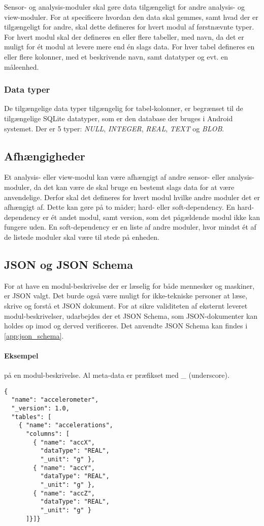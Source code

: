 Sensor- og analysis-moduler skal gøre data tilgængeligt for andre analysis- og view-moduler.
For at specificere hvordan den data skal gemmes, samt hvad der er tilgængeligt for andre, skal dette defineres for hvert modul af førstnævnte typer.
For hvert modul skal der defineres en eller flere tabeller, med navn, da det er muligt for ét modul at levere mere end én slags data.
For hver tabel defineres en eller flere kolonner, med et beskrivende navn, samt datatyper og evt. en måleenhed.

\subsubsection{Data typer}
De tilgængelige data typer tilgængelig for tabel-kolonner, er begrænset til de tilgængelige SQLite datatyper, som er den database der bruges i Android systemet.
Der er 5 typer: \textit{NULL}, \textit{INTEGER}, \textit{REAL}, \textit{TEXT} og \textit{BLOB}.

\subsection{Afhængigheder}
Et analysis- eller view-modul kan være afhængigt af andre sensor- eller analysis-moduler, da det kan være de skal bruge en bestemt slags data for at være anvendelige.
Derfor skal det defineres for hvert modul hvilke andre moduler det er afhængigt af.
Dette kan gøre på to måder; hard- eller soft-dependency.
En hard-dependency er ét andet modul, samt version, som det pågældende modul ikke kan fungere uden.
En soft-dependency er en liste af andre moduler, hvor mindst ét af de listede moduler skal være til stede på enheden.

\subsection{JSON og JSON Schema}
For at have en modul-beskrivelse der er læselig for både mennesker og maskiner, er JSON valgt.
Det burde også være muligt for ikke-tekniske personer at læse, skrive og forstå et JSON dokument.
For at sikre validiteten af eksternt leveret modul-beskrivelser, udarbejdes der et JSON Schema, som JSON-dokumenter kan holdes op imod og derved verificeres.
Det anvendte JSON Schema kan findes i \cref{app:json_schema}.

\paragraph{Eksempel} på en modul-beskrivelse.
Al meta-data er præfikset med \_ (underscore).
\begin{lstlisting}
{
  "name": "accelerometer",
  "_version": 1.0,
  "tables": [
    { "name": "accelerations",
      "columns": [
        { "name": "accX",
          "dataType": "REAL",
          "_unit": "g" },
        { "name": "accY",
          "dataType": "REAL",
          "_unit": "g" },
        { "name": "accZ",
          "dataType": "REAL",
          "_unit": "g" }
      ]}]}
\end{lstlisting}

